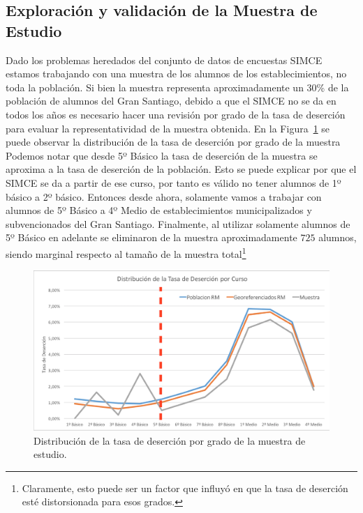 \subsection{Exploración y validación de la Muestra de Estudio}
Dado los problemas heredados del conjunto de datos de encuestas SIMCE estamos trabajando con una muestra de los alumnos de los establecimientos, no toda la población. Si bien la muestra representa aproximadamente un 30\% de la población de alumnos del Gran Santiago, debido a que el SIMCE no se da en todos los años es necesario hacer una revisión por grado de la tasa de deserción para evaluar la representatividad de la muestra obtenida. En la Figura~\ref{fig:deserciongradomuestra} se puede observar la distribución de la tasa de deserción por grado de la muestra Podemos notar que desde 5º Básico la tasa de deserción de la muestra se aproxima a la tasa de deserción de la población. Esto se puede explicar por que el SIMCE se da a partir de ese curso, por tanto es válido no tener alumnos de 1º básico a 2º básico. Entonces desde ahora, solamente vamos a trabajar con alumnos de 5º Básico a 4º Medio de establecimientos municipalizados y subvencionados del Gran Santiago.
Finalmente, al utilizar solamente alumnos de 5º Básico en adelante se eliminaron de la muestra aproximadamente $725$ alumnos, siendo marginal respecto al tamaño de la muestra total\footnote{Claramente, esto puede ser un factor que influyó en que la tasa de deserción esté distorsionada para esos grados.}
\begin{figure}[H]
  \centering
    \includegraphics[trim=0cm 0cm 0cm 0cm,scale=0.5]{Figuras/6SolucionPropuesta/testdist1.png}
      \caption{Distribución de la tasa de deserción por grado de la muestra de estudio.}
    \label{fig:deserciongradomuestra}
\end{figure}

